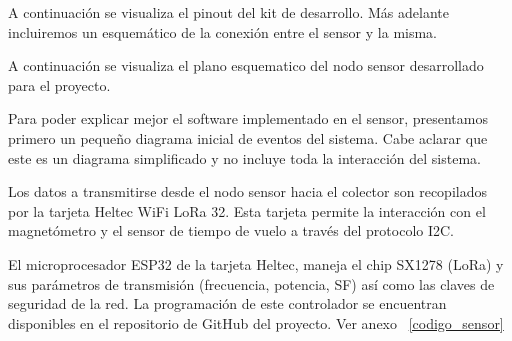 A continuación se visualiza el pinout del kit de desarrollo. Más adelante incluiremos un esquemático de la conexión entre el sensor y la misma.





A continuación se visualiza el plano esquematico del nodo sensor desarrollado para el proyecto.

Para poder explicar mejor el software implementado en el sensor, presentamos primero un pequeño diagrama inicial de eventos del sistema. Cabe aclarar que este es un diagrama simplificado y no incluye toda la interacción del sistema.


Los datos a transmitirse desde el nodo sensor hacia el colector son recopilados por la tarjeta Heltec WiFi LoRa 32. Esta tarjeta permite la interacción con el magnetómetro y el sensor de tiempo de vuelo a través del protocolo I2C.

El microprocesador ESP32 de la tarjeta Heltec, maneja el chip SX1278 (LoRa) y sus parámetros de transmisión (frecuencia, potencia, SF) así como las claves de seguridad de la red. La programación de este controlador se encuentran disponibles en el repositorio de GitHub del proyecto. Ver anexo ~\ref{codigo_sensor}

